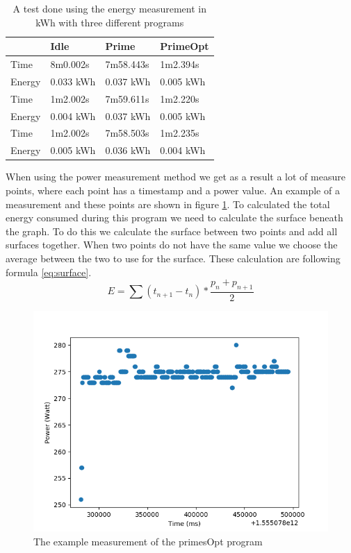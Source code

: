 \begin{table}[h]
\centering
\begin{tabular}{|l|l|l|l|}
\hline
       & \textbf{Idle}      & \textbf{Prime}     & \textbf{PrimeOpt}  \\ \hline
Time   & 8m0.002s  & 7m58.443s & 1m2.394s  \\
Energy & 0.033 kWh & 0.037 kWh & 0.005 kWh \\ \hline
Time   & 1m2.002s  & 7m59.611s & 1m2.220s  \\
Energy & 0.004 kWh & 0.037 kWh & 0.005 kWh \\ \hline
Time   & 1m2.002s  & 7m58.503s & 1m2.235s  \\
Energy & 0.005 kWh & 0.036 kWh & 0.004 kWh \\ \hline
\end{tabular}
\caption{A test done using the energy measurement in kWh with three different programs}
\label{tab:EMmethod}
\end{table}

When using the power measurement method we get as a result a lot of measure points, where each point has a timestamp and a power value. An example of a measurement and these points are shown in figure \ref{fig:primesOpt}. To calculated the total energy consumed during this program we need to calculate the surface beneath the graph. To do this we calculate the surface between two points and add all surfaces together. When two points do not have the same value we choose the average between the two to use for the surface. These calculation are following formula \ref{eq:surface}.\\

\begin{equation} \label{eq:surface}
    E = \sum (t_{n+1} - t_{n}) * \frac{p_{n} + p_{n+1}}{2}
\end{equation}

\begin{figure}[h]
    \centering
    \includegraphics[width=.4\textwidth]{graphs/primesOpt.png}
    \caption{The example measurement of the primesOpt program}
    \label{fig:primesOpt}
\end{figure}

